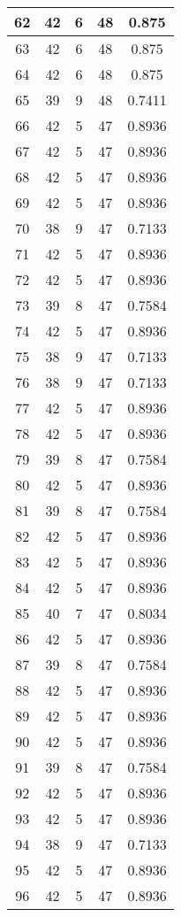 \documentclass[letterpaper, 12pt]{article}
\begin{document}
\begin{longtable}{|c|c|c|c|c|}
\hline
62 & 42 & 6 & 48 & 0.875 \\
\hline
63 & 42 & 6 & 48 & 0.875 \\
\hline
64 & 42 & 6 & 48 & 0.875 \\
\hline
65 & 39 & 9 & 48 & 0.7411 \\
\hline
66 & 42 & 5 & 47 & 0.8936 \\
\hline
67 & 42 & 5 & 47 & 0.8936 \\
\hline
68 & 42 & 5 & 47 & 0.8936 \\
\hline
69 & 42 & 5 & 47 & 0.8936 \\
\hline
70 & 38 & 9 & 47 & 0.7133 \\
\hline
71 & 42 & 5 & 47 & 0.8936 \\
\hline
72 & 42 & 5 & 47 & 0.8936 \\
\hline
73 & 39 & 8 & 47 & 0.7584 \\
\hline
74 & 42 & 5 & 47 & 0.8936 \\
\hline
75 & 38 & 9 & 47 & 0.7133 \\
\hline
76 & 38 & 9 & 47 & 0.7133 \\
\hline
77 & 42 & 5 & 47 & 0.8936 \\
\hline
78 & 42 & 5 & 47 & 0.8936 \\
\hline
79 & 39 & 8 & 47 & 0.7584 \\
\hline
80 & 42 & 5 & 47 & 0.8936 \\
\hline
81 & 39 & 8 & 47 & 0.7584 \\
\hline
82 & 42 & 5 & 47 & 0.8936 \\
\hline
83 & 42 & 5 & 47 & 0.8936 \\
\hline
84 & 42 & 5 & 47 & 0.8936 \\
\hline
85 & 40 & 7 & 47 & 0.8034 \\
\hline
86 & 42 & 5 & 47 & 0.8936 \\
\hline
87 & 39 & 8 & 47 & 0.7584 \\
\hline
88 & 42 & 5 & 47 & 0.8936 \\
\hline
89 & 42 & 5 & 47 & 0.8936 \\
\hline
90 & 42 & 5 & 47 & 0.8936 \\
\hline
91 & 39 & 8 & 47 & 0.7584 \\
\hline
92 & 42 & 5 & 47 & 0.8936 \\
\hline
93 & 42 & 5 & 47 & 0.8936 \\
\hline
94 & 38 & 9 & 47 & 0.7133 \\
\hline
95 & 42 & 5 & 47 & 0.8936 \\
\hline
96 & 42 & 5 & 47 & 0.8936 \\

\end{longtable}
\end{document}
